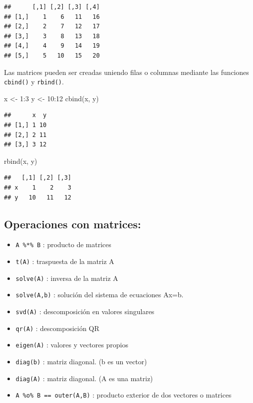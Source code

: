 \documentclass[
]{book}
\newenvironment{Shaded}{\begin{snugshade}}{\end{snugshade}}
\newcommand{\DecValTok}[1]{\textcolor[rgb]{0.00,0.00,0.81}{#1}}
\newcommand{\FunctionTok}[1]{\textcolor[rgb]{0.00,0.00,0.00}{#1}}
\newcommand{\NormalTok}[1]{#1}
\newcommand{\OtherTok}[1]{\textcolor[rgb]{0.56,0.35,0.01}{#1}}
\newcommand{\SpecialCharTok}[1]{\textcolor[rgb]{0.00,0.00,0.00}{#1}}
\providecommand{\tightlist}{%
  \setlength{\itemsep}{0pt}\setlength{\parskip}{0pt}}
\begin{document}
\begin{verbatim}
##      [,1] [,2] [,3] [,4]
## [1,]    1    6   11   16
## [2,]    2    7   12   17
## [3,]    3    8   13   18
## [4,]    4    9   14   19
## [5,]    5   10   15   20
\end{verbatim}

Las matrices pueden ser creadas uniendo filas o columnas mediante las funciones \texttt{cbind()} y \texttt{rbind()}.

\begin{Shaded}
\begin{Highlighting}[]
\NormalTok{x }\OtherTok{\textless{}{-}} \DecValTok{1}\SpecialCharTok{:}\DecValTok{3}
\NormalTok{y }\OtherTok{\textless{}{-}} \DecValTok{10}\SpecialCharTok{:}\DecValTok{12}
\FunctionTok{cbind}\NormalTok{(x, y)}
\end{Highlighting}
\end{Shaded}

\begin{verbatim}
##      x  y
## [1,] 1 10
## [2,] 2 11
## [3,] 3 12
\end{verbatim}

\begin{Shaded}
\begin{Highlighting}[]
\FunctionTok{rbind}\NormalTok{(x, y)}
\end{Highlighting}
\end{Shaded}

\begin{verbatim}
##   [,1] [,2] [,3]
## x    1    2    3
## y   10   11   12
\end{verbatim}

\hypertarget{operaciones-con-matrices}{%
\subsection{Operaciones con matrices:}\label{operaciones-con-matrices}}

\begin{itemize}
\tightlist
\item
  \texttt{A\ \%*\%\ B} : producto de matrices
\item
  \texttt{t(A)} : traspuesta de la matriz A
\item
  \texttt{solve(A)} : inversa de la matriz A
\item
  \texttt{solve(A,b)} : solución del sistema de ecuaciones Ax=b.
\item
  \texttt{svd(A)} : descomposición en valores singulares
\item
  \texttt{qr(A)} : descomposición QR
\item
  \texttt{eigen(A)} : valores y vectores propios
\item
  \texttt{diag(b)} : matriz diagonal. (b es un vector)
\item
  \texttt{diag(A)} : matriz diagonal. (A es una matriz)
\item
  \texttt{A\ \%o\%\ B\ ==\ outer(A,B)} : producto exterior de dos vectores o matrices
\end{itemize}
\end{document}
